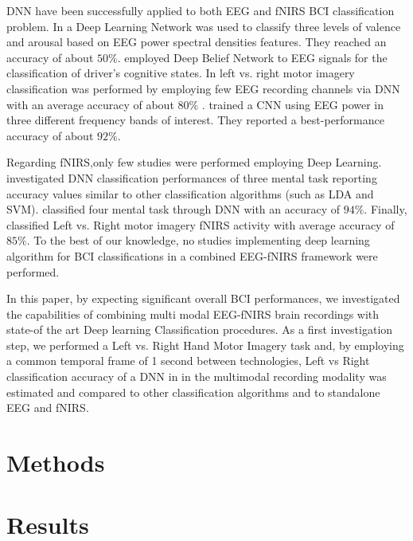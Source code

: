 \documentclass[12pt ]{iopart}
\begin{document}
DNN have been successfully applied to  both EEG and fNIRS BCI classification problem. In \textcite{jirayucharoensak2014eeg} a Deep Learning Network was used to classify three levels of valence and arousal based on EEG power spectral densities  features. They reached an accuracy of about $50\%$. 
\textcite{hajinoroozi2015feature} employed Deep Belief Network to EEG signals for the classification of driver's cognitive states. 
In \textcite{an2014deep} left vs. right motor imagery classification  was performed by employing few EEG recording channels via DNN with an average accuracy of about $80\%$ . 
 \textcite{bashivan2015learning} trained a CNN using EEG power in three different frequency bands of interest. They reported a best-performance accuracy of about $92\%$.

Regarding fNIRS,only  few  studies were performed employing Deep Learning.  \textcite{hennrich2015investigating} investigated DNN classification performances of three mental task reporting accuracy values similar  to other classification algorithms (such as LDA and SVM).  \textcite{abibullaev2011neural} classified four mental task through DNN with an accuracy of $94\%$. Finally, \textcite{nguyen2013temporal} classified Left vs. Right motor imagery fNIRS activity with average accuracy of $85\%$. To the best of our knowledge, no studies implementing deep learning algorithm for BCI classifications  in a combined EEG-fNIRS framework were performed.

 In this paper, by expecting significant overall BCI performances,  we investigated the capabilities of combining multi modal EEG-fNIRS brain recordings  with state-of the art Deep learning Classification procedures. As a first investigation step, we performed a Left vs. Right Hand Motor Imagery task \parencite{pfurtscheller2001motor} and, by employing a common temporal frame of 1 second between technologies, Left vs Right classification accuracy of a DNN in in the multimodal recording modality was estimated and compared to other classification algorithms and to standalone EEG and fNIRS. 




\section{Methods}

\section{Results}
\end{document}

